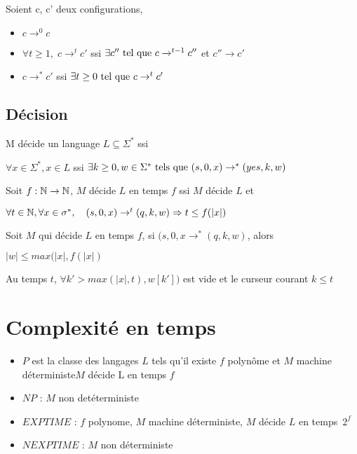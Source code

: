 \documentclass[10pt,a4paper]{article}
\begin{document}
\begin{definition} Soient c, c' deux configurations, \begin{itemize}
\item $c \rightarrow^0 c$
\item $ \forall t \geq 1, \; c \rightarrow^t c' $ ssi $ \exists c'' \tq c \rightarrow^{t-1}c''$ et $c'' \rightarrow c'$
\item $c \rightarrow^* c'$ ssi $\exists t \geq 0 \tq c \rightarrow^t c'$
\end{itemize} \end{definition}

\subsection{Décision} 

 \begin{definition}
M décide un language $L \subseteq \Sigma^*$ ssi 

$\forall x \in \Sigma^*, x \in L$ ssi $\exists k \geq 0, w \in \Sigma^* \tq[s] (s, 0, x) \rightarrow^* (yes, k, w)$\\
  \end{definition}

 \begin{definition}
 Soit $f : \Ns\to \Ns$, $M$ décide $L$ en temps $f$ ssi $M$ décide $L$ et 

$\forall t \in \Ns, \forall x \in \sigma^*, \quad (s, 0, x) \rightarrow ^t (q, k, w) \Rightarrow t \leq f( | x | )$\\
 \end{definition}

\begin{prop}
 Soit $M$ qui décide $L$ en temps $f$, si $(s, 0, x \rightarrow^* (q, k, w)$, alors 

$ | w |  \leq max (  | x | , f( | x | )$
\end{prop}
 \begin{dem}
  Au temps $t$, $\forall k' > max (  | x | , t), w[k'] )$ est vide et le curseur courant $k \leq t$\\
 \end{dem}

 \section{Complexité en temps}
 
 \begin{definition}{}\begin{itemize}
 \item $P$ est la classe des langages $L$ tels qu'il existe $f$ polynôme et $M$ machine déterministe\tq[s] $M$ décide L en temps $f$
\item $NP$ : $M$ non detéterministe
\item $EXPTIME$ : $f$ polynome, $M$ machine déterministe, $M$ décide $L$ en temps~$2^f$
 \item $NEXPTIME$ : $M$ non déterministe
 \end{itemize}
 \end{definition}
\end{document}
